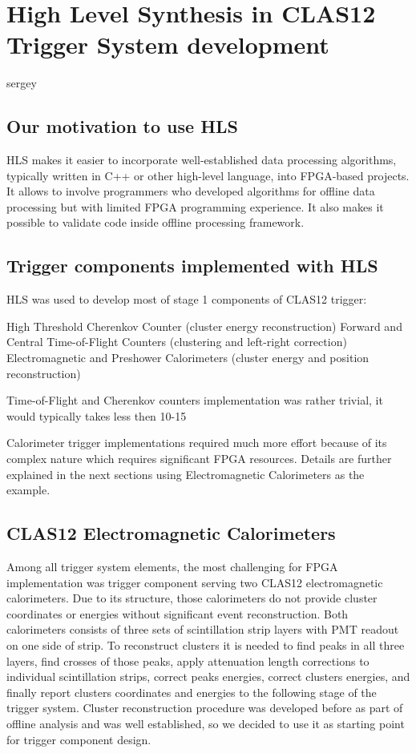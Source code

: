 \section{High Level Synthesis in CLAS12 Trigger System development} sergey

\subsection{Our motivation to use HLS}

HLS makes it easier to incorporate well-established data processing algorithms, typically written in C++ or other high-level language, into FPGA-based projects.
It allows to involve programmers who developed algorithms for offline data processing but with limited FPGA programming experience. It also makes it possible to validate code inside offline processing framework.

\subsection{Trigger components implemented with HLS}

HLS was used to develop most of stage 1 components of CLAS12 trigger:

High Threshold Cherenkov Counter (cluster energy reconstruction)
Forward and Central Time-of-Flight Counters (clustering and left-right correction)
Electromagnetic and Preshower Calorimeters (cluster energy and position reconstruction)

Time-of-Flight and Cherenkov counters implementation was rather trivial, it would typically takes less then 10-15%

Calorimeter trigger implementations required much more effort because of its complex nature which requires significant FPGA resources. Details are further explained in the next sections using Electromagnetic Calorimeters as the example.


\subsection{CLAS12 Electromagnetic Calorimeters}

Among all trigger system elements, the most challenging for FPGA implementation was trigger component serving two CLAS12 electromagnetic calorimeters. Due to its structure, those calorimeters do not provide cluster coordinates or energies without significant event reconstruction. Both calorimeters consists of three sets of scintillation strip layers with PMT readout on one side of strip. To reconstruct clusters it is needed to find peaks in all three layers, find crosses of those peaks, apply attenuation length corrections to individual scintillation strips, correct peaks energies, correct clusters energies, and finally report clusters coordinates and energies to the following stage of the trigger system. Cluster reconstruction procedure was developed before as part of offline analysis and was well established, so we decided to use it as starting point for trigger component design.

